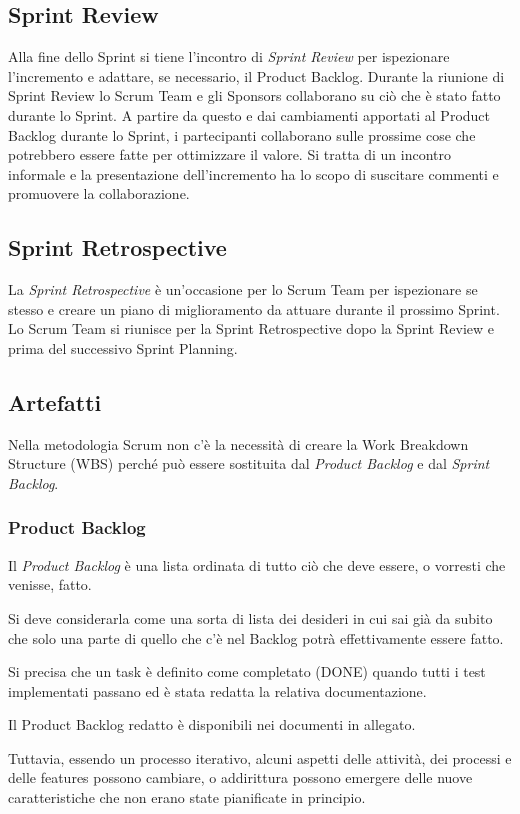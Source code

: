 \documentclass{article}
\begin{document}
\subsection{Sprint Review}
Alla fine dello Sprint si tiene l'incontro di \textit{Sprint Review} per ispezionare l'incremento e adattare, se
necessario, il Product Backlog. Durante la riunione di Sprint Review lo Scrum Team e gli Sponsors
collaborano su ciò che è stato fatto durante lo Sprint. A partire da questo e dai cambiamenti apportati al
Product Backlog durante lo Sprint, i partecipanti collaborano sulle prossime cose che potrebbero essere
fatte per ottimizzare il valore. Si tratta di un incontro informale e la presentazione dell'incremento ha lo
scopo di suscitare commenti e promuovere la collaborazione.

\subsection{Sprint Retrospective}
La \textit{Sprint Retrospective} è un'occasione per lo Scrum Team per ispezionare se stesso e creare un piano di
miglioramento da attuare durante il prossimo Sprint. Lo Scrum Team si riunisce per la Sprint Retrospective dopo 
la Sprint Review e prima del successivo Sprint Planning.

\subsection{Artefatti}
Nella metodologia Scrum non c'è la necessità di creare la Work Breakdown Structure (WBS) 
perché può essere sostituita dal \textit{Product Backlog} e dal \textit{Sprint Backlog}.

\subsubsection{Product Backlog}
Il \textit{Product Backlog} è una lista ordinata di tutto ciò che deve essere, o vorresti che venisse, fatto.

Si deve considerarla come una sorta di lista dei desideri in cui sai già da subito che solo una
parte di quello che c'è nel Backlog potrà effettivamente essere fatto.

Si precisa che un task è definito come completato (DONE) quando tutti i test implementati passano 
ed è stata redatta la relativa documentazione.

Il Product Backlog redatto è disponibili nei documenti in allegato.

Tuttavia, essendo un processo iterativo, alcuni aspetti delle attività, dei processi e delle features 
possono cambiare, o addirittura possono emergere delle nuove caratteristiche che non erano state 
pianificate in principio.
\end{document}
